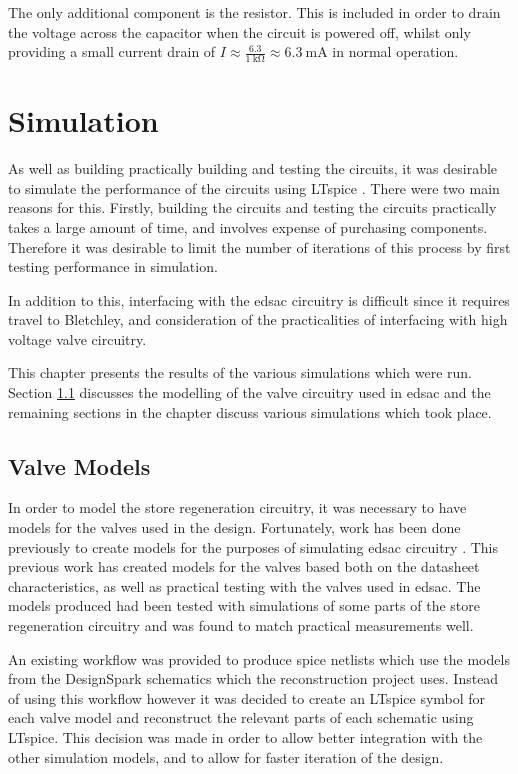 The only additional component is the resistor. This is included in order to drain the voltage across the capacitor when the circuit is powered off, whilst only providing a small current drain of $I \approx \frac{6.3}{\SI{1}{\kilo\ohm}} \approx \SI{6.3}{\milli\ampere}$ in normal operation.

\chapter{ Simulation}
As well as building practically building and testing the circuits, it was desirable to simulate the performance of the circuits using LTspice \cite{linear2017}. There were two main reasons for this. Firstly, building the circuits and testing the circuits practically takes a large amount of time, and involves expense of purchasing components. Therefore it was desirable to limit the number of iterations of this process by first testing performance in simulation.

In addition to this, interfacing with the \gls{edsac} circuitry is difficult since it requires travel to Bletchley, and consideration of the practicalities of interfacing with high voltage valve circuitry.

This chapter presents the results of the various simulations which were run. Section \ref{sec:spice-valve-models} discusses the modelling of the valve circuitry used in \gls{edsac} and the remaining sections in the chapter discuss various simulations which took place.

\section{Valve Models} \label{sec:spice-valve-models}

In order to model the store regeneration circuitry, it was necessary to have models for the valves used in the design. Fortunately, work has been done previously to create models for the purposes of simulating \gls{edsac} circuitry \cite{linnington2015}. This previous work has created models for the valves based both on the datasheet characteristics, as well as practical testing with the valves used in \gls{edsac}. The models produced had been tested with simulations of some parts of the store regeneration circuitry and was found to match practical measurements well.

An existing workflow was provided to produce \gls{spice} netlists which use the models from the DesignSpark \cite{rs2017} schematics which the reconstruction project uses. Instead of using this workflow however it was decided to create an LTspice symbol for each valve model and reconstruct the relevant parts of each schematic using LTspice. This decision was made in order to allow better integration with the other simulation models, and to allow for faster iteration of the design.

